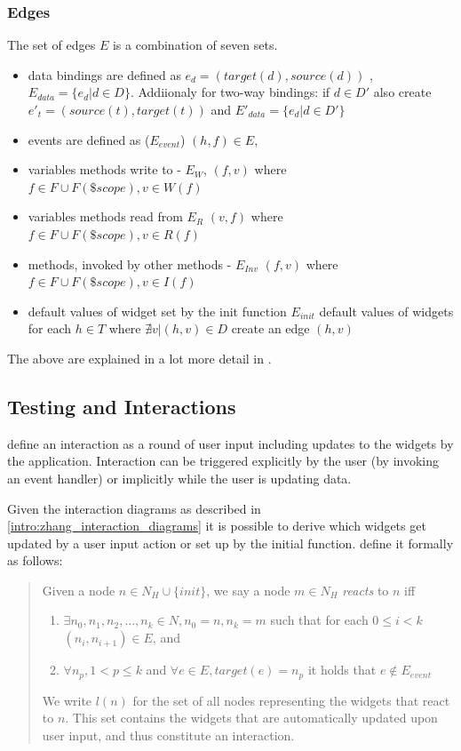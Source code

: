 \subsubsection{Edges}
The set of edges $E$ is a combination of seven sets.

\begin{itemize}
  \item data bindings are defined as $e_d = (target(d),source(d))$ , $E_{data} = \{e_d |  d \in D \}$. Addiionaly for two-way bindings: if $d \in D'$ also create $e'_t = (source(t),target(t))$ and $E'_{data} = \{e_d |  d \in D' \}$
\item events are defined as ($E_{event}$) $(h,f) \in E$,
\item variables methods write to - $E_{W}$, $(f,v)$ where $f \in F \cup F(\$scope), v \in W(f)$
\item variables methods read from $E_{R}$ $(v,f)$ where $f \in F \cup F(\$scope), v \in R(f)$
\item methods, invoked by other methods - $E_{Inv}$ $(f,v)$ where $f \in F \cup F(\$scope), v \in I(f)$
\item  default values of widget set by the init function
$E_{init}$ default values of widgets 
for each $h \in T $ where $ \nexists v | (h,v) \in D$ create an edge $(h,v)$ 
\end{itemize}
The above are explained in a lot more detail in \parencite[9]{zhang2019scenario}.

\subsection{Testing and Interactions}
\textcite{zhang2019scenario} define an interaction as a round of user input including updates to the widgets by the application. Interaction can be triggered explicitly by the user (by invoking an event handler) or implicitly while the user is updating data. \parencite{zhang2019scenario}

Given the interaction diagrams as described in \ref{intro:zhang_interaction_diagrams} it is possible to derive which widgets get updated by a user input action or set up by the initial function. \textcite{zhang2019scenario} define it formally as follows:
\begin{quote}
\label{quote:interactions}
Given a node $n \in N_H \cup \{init\}$, we say a node $m \in N_H$ \textit{reacts} to $n$ iff
  \begin{enumerate}
      \item $\exists n_0,n_1,n_2, \ldots,n_k \in N, n_0=n,n_k=m$ such that for each $0 \leq i < k  $ $(n_i,n_{i+1}) \in E$, and 
      \item $\forall n_p, 1 < p \leq k$ and $\forall e \in E, target(e)= n_p$ it holds that $e \notin E_{event}$  
  \end{enumerate}
  We write $l(n)$ for the set of all nodes representing the widgets that react to $n$. This set contains the widgets that are automatically updated upon user input,
  and thus constitute an interaction.
  \end{quote}

